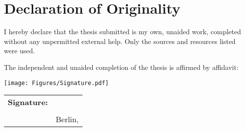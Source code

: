 \section*{Declaration of Originality}
I hereby declare that the thesis submitted is my own, unaided work, completed without any unpermitted external help. Only the sources and resources listed were used.

The independent and unaided completion of the thesis is affirmed by affidavit:

\vspace*{1cm}
\hspace*{3.2cm} \texttt{[image: Figures/Signature.pdf]}
\vspace*{-1cm}

\begin{tabular}{@{}p{2cm}p{8cm}@{}}
	\textbf{Signature:} & \hrulefill \\
	& \thesisauthor \\
	& Berlin, \submissiondate \\
\end{tabular}